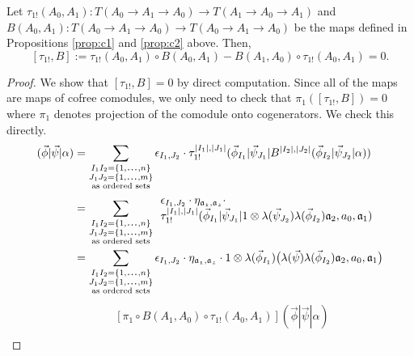 \begin{prop}
\label{prop:c3}
Let $\tau_{1!}(A_0,A_1): 
T(A_0 \to A_1 \to A_0) \longrightarrow
T(A_1 \to A_0 \to A_1)$ and 
$B(A_0,A_1): T(A_0 \to A_1 \to A_0) 
\longrightarrow T(A_0 \to A_1 \to A_0)$ 
be the maps defined in Propositions 
\ref{prop:c1} and \ref{prop:c2} above. 
Then, $$[\tau_{1!}, B] := 
\tau_{1!}(A_0,A_1) \circ B(A_0,A_1) - 
B(A_1,A_0) \circ \tau_{1!}(A_0,A_1) = 0.$$
\end{prop}
%
\begin{proof}
We show that $[\tau_{1!}, B] = 0$ by direct 
computation. Since all of the maps are maps 
of cofree comodules, we only need to check 
that $\pi_1([\tau_{1!}, B]) = 0$ where 
$\pi_1$ denotes projection of the comodule 
onto cogenerators. We check this directly.
%
\begin{align*}
[\pi_1 \circ \tau_{1!}(A_0,A_1) \circ B(A_0,A_1)] 
  (\vec{\phi} | \vec{\psi} | \alpha ) 
&= 
\sum \limits_{\substack{
  I_1I_2 = \{1,\smdots,n\}\\
  J_1J_2 = \{1,\smdots,m\}\\
  \textrm{as ordered sets}}}
\epsilon_{I_1,J_2} \cdot
  \tau_{1!}^{|I_1|, |J_1|} (\vec{\phi}_{I_1} | \vec{\psi}_{J_1} | 
    B^{|I_2|, |J_2|} (\vec{\phi}_{I_2} | \vec{\psi}_{J_2} | \alpha)) \\
&= 
\sum \limits_{\substack{
  I_1I_2 = \{1,\smdots,n\}\\
  J_1J_2 = \{1,\smdots,m\}\\
  \textrm{as ordered sets}}}
\begin{array}{l}  
\epsilon_{I_1,J_2} \cdot 
\eta_{\mathfrak{a_1},\mathfrak{a_2}} \cdot\\
\tau_{1!}^{|I_1|, |J_1|} (\vec{\phi}_{I_1} | \vec{\psi}_{J_1} | 
  1 \otimes \lambda(\vec{\psi}_{J_2}) \lambda(\vec{\phi}_{I_2}) 
  \mathfrak{a}_2, a_0, \mathfrak{a}_1)
\end{array} \\
&= 
\sum \limits_{\substack{
  I_1I_2 = \{1,\smdots,n\}\\
  J_1J_2 = \{1,\smdots,m\}\\
  \textrm{as ordered sets}}}
\epsilon_{I_1,J_2} \cdot 
\eta_{\mathfrak{a_1},\mathfrak{a_2}} \cdot
1 \otimes \lambda(\vec{\phi}_{I_1}) \big( 
  \lambda(\vec{\psi}) \lambda(\vec{\phi}_{I_2}) 
  \mathfrak{a}_2, a_0, \mathfrak{a}_1 \big)
\end{align*}
%
\begin{align*}
& \phantom{{}={}}
[\pi_1 \circ B(A_1,A_0) \circ \tau_{1!}(A_0,A_1)] 
  (\vec{\phi} | \vec{\psi} | \alpha ) \\

\end{align*}
\end{proof}
